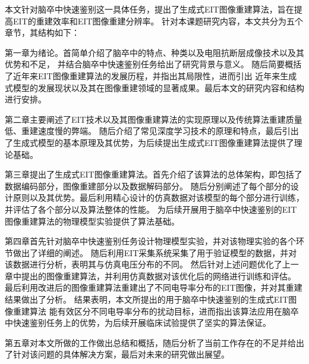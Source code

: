 
本文针对脑卒中快速鉴别这一具体任务，提出了生成式EIT图像重建算法，旨在提高EIT的重建效率和EIT图像重建分辨率。
针对本课题研究内容，本文共分为五个章节，其结构如下：

第一章为绪论。首简单介绍了脑卒中的特点、种类以及电阻抗断层成像技术以及其优势和不足，
并结合脑卒中快速鉴别任务给出了研究背景与意义。 随后简要概括了近年来EIT图像重建算法的发展历程，并指出其局限性，进而引出
近年来生成式模型的发展现状以及其在图像重建领域的显著成果。最后本文的研究内容和结构进行安排。

第二章主要阐述了EIT技术以及其图像重建算法的实现原理以及传统算法重建质量低、重建速度慢的弊端。
随后介绍了常见深度学习技术的原理和特点，最后引出了生成式模型的基本原理及其优势，为后续提出生成式EIT图像重建算法提供了理论基础。

第三章提出了生成式EIT图像重建算法。首先介绍了该算法的总体架构，即包括了数据编码部分，图像重建部分以及数据解码部分。
随后分别阐述了每个部分的设计原则以及其优势。最后利用精心设计的仿真数据对该模型的每个部分进行训练，并评估了各个部分以及算法整体的性能。
为后续开展用于脑卒中快速鉴别的EIT图像重建算法的物理模型实验提供了算法基础。

第四章首先针对脑卒中快速鉴别任务设计物理模型实验，并对该物理实验的各个环节做出了详细的阐述。
随后利用EIT采集系统采集了用于验证模型的数据，并对该数据进行分析，表明其与仿真电压分布的不同。
然后针对上述问题优化了上一章中提出的图像重建算法，并利用仿真数据对该优化后的网络进行训练和评估。
最后利用改进后的图像重建算法重建出了不同电导率分布的EIT图像，并对其重建结果做出了分析。
结果表明，本文所提出的用于脑卒中快速鉴别的生成式EIT图像重建算法
能有效区分不同电导率分布的扰动目标，进而指出该算法应用在脑卒中快速鉴别任务上的优势，为后续开展临床试验提供了坚实的算法保证。

第五章对本文所做的工作做出总结和概括，随后分析了当前工作存在的不足并给出了针对该问题的具体解决方案，最后对未来的研究做出展望。